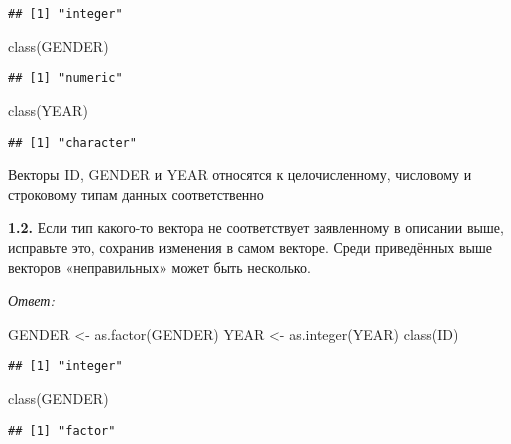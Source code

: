 \documentclass[
]{article}
\newenvironment{Shaded}{\begin{snugshade}}{\end{snugshade}}
\newcommand{\FunctionTok}[1]{\textcolor[rgb]{0.00,0.00,0.00}{#1}}
\newcommand{\NormalTok}[1]{#1}
\newcommand{\OtherTok}[1]{\textcolor[rgb]{0.56,0.35,0.01}{#1}}
\begin{document}
\begin{verbatim}
## [1] "integer"
\end{verbatim}

\begin{Shaded}
\begin{Highlighting}[]
\FunctionTok{class}\NormalTok{(GENDER)}
\end{Highlighting}
\end{Shaded}

\begin{verbatim}
## [1] "numeric"
\end{verbatim}

\begin{Shaded}
\begin{Highlighting}[]
\FunctionTok{class}\NormalTok{(YEAR)}
\end{Highlighting}
\end{Shaded}

\begin{verbatim}
## [1] "character"
\end{verbatim}

Векторы ID, GENDER и YEAR относятся к целочисленному, числовому и
строковому типам данных соответственно

\textbf{1.2.} Если тип какого-то вектора не соответствует заявленному в
описании выше, исправьте это, сохранив изменения в самом векторе. Среди
приведённых выше векторов «неправильных» может быть несколько.

\emph{Ответ:}

\begin{Shaded}
\begin{Highlighting}[]
\NormalTok{GENDER }\OtherTok{\textless{}{-}} \FunctionTok{as.factor}\NormalTok{(GENDER)}
\NormalTok{YEAR }\OtherTok{\textless{}{-}} \FunctionTok{as.integer}\NormalTok{(YEAR)}
\FunctionTok{class}\NormalTok{(ID)}
\end{Highlighting}
\end{Shaded}

\begin{verbatim}
## [1] "integer"
\end{verbatim}

\begin{Shaded}
\begin{Highlighting}[]
\FunctionTok{class}\NormalTok{(GENDER)}
\end{Highlighting}
\end{Shaded}

\begin{verbatim}
## [1] "factor"
\end{verbatim}
\end{document}
